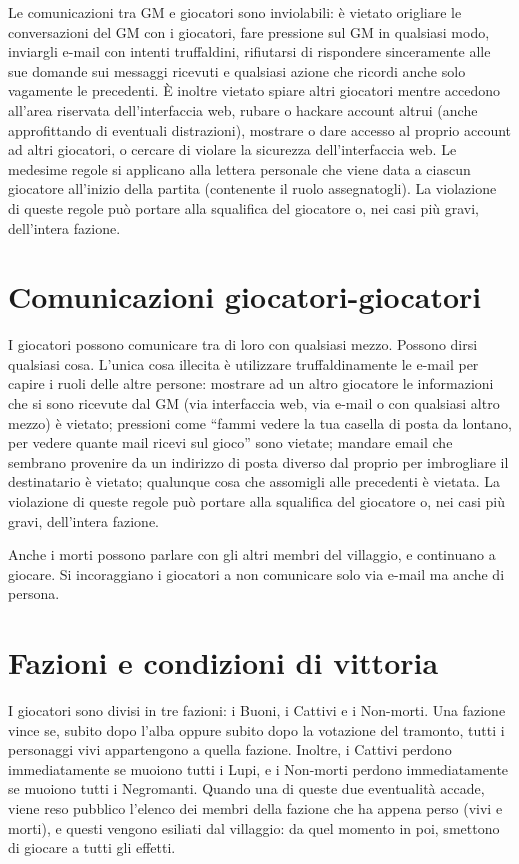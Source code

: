 \documentclass[a4paper,10pt]{article}
\begin{document}
Le comunicazioni tra GM e giocatori sono inviolabili: è vietato origliare le conversazioni del GM con i giocatori, fare pressione sul GM in qualsiasi modo, inviargli e-mail con intenti truffaldini, rifiutarsi di rispondere sinceramente alle sue domande sui messaggi ricevuti e qualsiasi azione che ricordi anche solo vagamente le precedenti.
È inoltre vietato spiare altri giocatori mentre accedono all'area riservata dell'interfaccia web, rubare o hackare account altrui (anche approfittando di eventuali distrazioni), mostrare o dare accesso al proprio account ad altri giocatori, o cercare di violare la sicurezza dell'interfaccia web.
Le medesime regole si applicano alla lettera personale che viene data a ciascun giocatore all'inizio della partita (contenente il ruolo assegnatogli).
La violazione di queste regole può portare alla squalifica del giocatore o, nei casi più gravi, dell'intera fazione.


\section{Comunicazioni giocatori-giocatori}

I giocatori possono comunicare tra di loro con qualsiasi mezzo. Possono dirsi qualsiasi cosa.
L’unica cosa illecita è utilizzare truffaldinamente le e-mail per capire i ruoli delle altre persone: mostrare ad un altro giocatore le informazioni che si sono ricevute dal GM (via interfaccia web, via e-mail o con qualsiasi altro mezzo) è vietato; pressioni come ``fammi vedere la tua casella di posta da lontano, per vedere quante mail ricevi sul gioco'' sono vietate; mandare email che sembrano provenire da un indirizzo di posta diverso dal proprio per imbrogliare il destinatario è vietato; qualunque cosa che assomigli alle precedenti è vietata. La violazione di queste regole può portare alla squalifica del giocatore o, nei casi più gravi, dell'intera fazione.

Anche i morti possono parlare con gli altri membri del villaggio, e continuano a giocare. Si incoraggiano i giocatori a non comunicare solo via e-mail ma anche di persona.



\section{Fazioni e condizioni di vittoria}

I giocatori sono divisi in tre fazioni: i Buoni, i Cattivi e i Non-morti.
Una fazione vince se, subito dopo l'alba oppure subito dopo la votazione del tramonto, tutti i personaggi vivi appartengono a quella fazione.
Inoltre, i Cattivi perdono immediatamente se muoiono tutti i Lupi, e i Non-morti perdono immediatamente se muoiono tutti i Negromanti. Quando una di queste due eventualità accade, viene reso pubblico l'elenco dei membri della fazione che ha appena perso (vivi e morti), e questi vengono esiliati dal villaggio: da quel momento in poi, smettono di giocare a tutti gli effetti.
\end{document}
